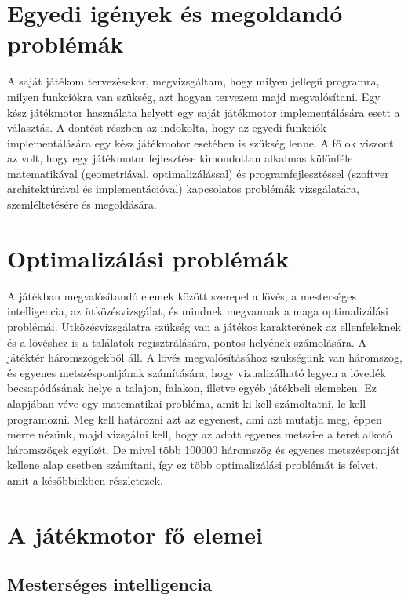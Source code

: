 \section{Egyedi igények és megoldandó problémák}

A saját játékom tervezésekor, megvizsgáltam, hogy milyen jellegű programra, milyen funkciókra van szükség, azt hogyan tervezem majd megvalósítani. Egy kész játékmotor használata helyett egy saját játékmotor implementálására esett a választás. A döntést részben az indokolta, hogy az egyedi funkciók implementálására egy kész játékmotor esetében is szükség lenne. A fő ok viszont az volt, hogy egy játékmotor fejlesztése kimondottan alkalmas különféle matematikával (geometriával, optimalizálással) és programfejlesztéssel (szoftver architektúrával és implementációval)  kapcsolatos problémák vizsgálatára, szemléltetésére és megoldására.

\section{Optimalizálási problémák}

A játékban megvalósítandó elemek között szerepel a lövés, a mesterséges intelligencia, az ütközésvizsgálat, és mindnek megvannak a maga optimalizálási problémái. Ütközésvizsgálatra szükség van a játékos karakterének az ellenfeleknek és a lövéshez is a találatok regisztrálására, pontos helyének számolására. A játéktér háromszögekből áll. A lövés megvalósításához szükségünk van háromszög, és egyenes metszéspontjának számítására, hogy vizualizálható legyen a lövedék becsapódásának helye a talajon, falakon, illetve egyéb játékbeli elemeken. Ez alapjában véve egy matematikai probléma, amit ki kell számoltatni, le kell programozni. Meg kell határozni azt az egyenest, ami azt mutatja meg, éppen merre nézünk, majd vizsgálni kell, hogy az adott egyenes metszi-e a teret alkotó háromszögek egyikét. De mivel több 100000 háromszög és egyenes metszéspontját kellene alap esetben számítani, így ez több optimalizálási problémát is felvet, amit a későbbiekben részletezek.

\section{A játékmotor fő elemei}

\subsection{Mesterséges intelligencia}

